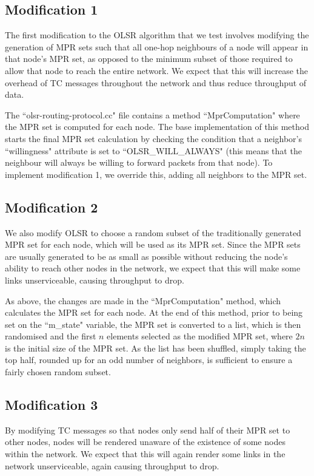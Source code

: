 \documentclass[12pt,a4paper]{article}
\begin{document}
\subsection{Modification 1}
The first modification to the OLSR algorithm that we test involves modifying the generation of MPR sets such that all one-hop neighbours of a node will appear in that node's MPR set, as opposed to the minimum subset of those required to allow that node to reach the entire network. We expect that this will increase the overhead of TC messages throughout the network and thus reduce throughput of data. 

The ``olsr-routing-protocol.cc" file contains a method ``MprComputation" where the MPR set is computed for each node. The base implementation of this method starts the final MPR set calculation by checking the condition that a neighbor's ``willingness" attribute is set to ``OLSR\_WILL\_ALWAYS" (this means that the neighbour will always be willing to forward packets from that node). To implement modification 1, we override this, adding all neighbors to the MPR set. 

\subsection{Modification 2}
We also modify OLSR to choose a random subset of the traditionally generated MPR set for each node, which will be used as its MPR set. Since the MPR sets are usually generated to be as small as possible without reducing the node's ability to reach other nodes in the network, we expect that this will make some links unserviceable, causing throughput to drop.

As above, the changes are made in the ``MprComputation" method, which calculates the MPR set for each node. At the end of this method, prior to being set on the ``m\_state" variable, the MPR set is converted to a list, which is then randomised and the first \(n\) elements selected as the modified MPR set, where \(2n\) is the initial size of the MPR set. As the list has been shuffled, simply taking the top half, rounded up for an odd number of neighbors, is sufficient to ensure a fairly chosen random subset.

\subsection{Modification 3}
By modifying TC messages so that nodes only send half of their MPR set to other nodes, nodes will be rendered unaware of the existence of some nodes within the network. We expect that this will again render some links in the network unserviceable, again causing throughput to drop.
\end{document}
